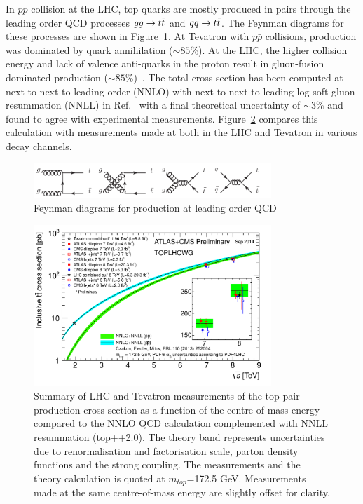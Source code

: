 In $pp$ collision at the LHC, top quarks are mostly produced in pairs through the leading order QCD processes  $gg \rightarrow t\bar{t}$ and $q\bar{q} \rightarrow t\bar{t}$. The Feynman diagrams for these processes are shown in Figure~\ref{fig:ttdiag}. At Tevatron with $p\bar{p}$ collisions, \ttbar production was dominated by quark annihilation ($\sim 85$\%). At the LHC, the higher collision energy and lack of valence anti-quarks in the proton result in gluon-fusion dominated \ttbar production ($\sim 85$\%)~\cite{PDG}. The total \ttbar cross-section has been computed at next-to-next-to leading order (NNLO) with next-to-next-to-leading-log soft gluon resummation (NNLL) in Ref.~\cite{Czakon:2013goa} with a final theoretical uncertainty of $\sim 3 \%$ and found to agree with experimental measurements. Figure~\ref{fig:ttxsec} compares this calculation with measurements made at both in the LHC and Tevatron in various decay channels.

\begin{figure}
\centering
\includegraphics[width=0.8\textwidth]{fig/thry/fig_ttbar.png}
\caption{Feynman diagrams for \ttbar production at leading order QCD}
\label{fig:ttdiag}
\end{figure}

\begin{figure}
\centering
\includegraphics[width=0.8\textwidth]{fig/thry/tt_xsec_vsroots.pdf}
\caption{Summary of LHC and Tevatron measurements of the top-pair production cross-section as a function of the centre-of-mass energy compared to the NNLO QCD calculation complemented with NNLL resummation (top++2.0). The theory band represents uncertainties due to renormalisation and factorisation scale, parton density functions and the strong coupling. The measurements and the theory calculation is quoted at $m_{top}$=172.5 GeV. Measurements made at the same centre-of-mass energy are slightly offset for clarity.}
\label{fig:ttxsec}
\end{figure}

